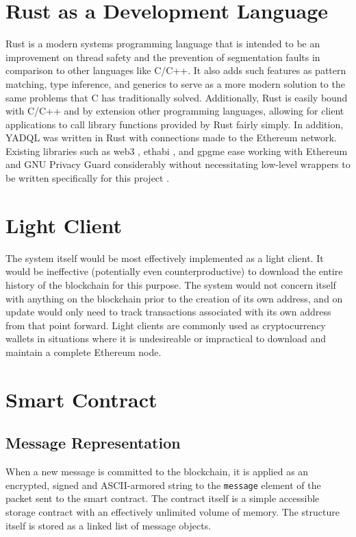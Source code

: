 \documentclass[]{article}
\begin{document}
\section{Rust as a Development Language}
Rust is a modern systems programming language that is intended to be an improvement on thread safety and the prevention of segmentation faults in comparison to other languages like C/C++. It also adds such features as pattern matching, type inference, and generics to serve as a more modern solution to the same problems that C has traditionally solved. Additionally, Rust is easily bound with C/C++ and by extension other programming languages, allowing for client applications to call library functions provided by Rust fairly simply. In addition, YADQL \cite{yadql} was written in Rust with connections made to the Ethereum network. Existing libraries such as web3 \cite{web3}, ethabi \cite{ethabi}, and gpgme \cite{gpgme} ease working with Ethereum and GNU Privacy Guard considerably without necessitating low-level wrappers to be written specifically for this project \cite{rust}.

\section{Light Client}
The system itself would be most effectively implemented as a light client. It would be ineffective (potentially even counterproductive) to download the entire history of the blockchain for this purpose. The system would not concern itself with anything on the blockchain prior to the creation of its own address, and on update would only need to track transactions associated with its own address from that point forward. Light clients are commonly used as cryptocurrency wallets in situations where it is undesireable or impractical to download and maintain a complete Ethereum node.

\section{Smart Contract}
\subsection{Message Representation}
When a new message is committed to the blockchain, it is applied as an encrypted, signed and ASCII-armored string to the \verb!message! element of the packet sent to the smart contract. The contract itself is a simple accessible storage contract with an effectively unlimited volume of memory. The structure itself is stored as a linked list of message objects.
\end{document}
